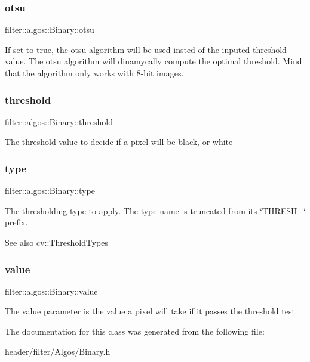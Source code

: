 \subsubsection{\texorpdfstring{otsu}{otsu}}
{\footnotesize\ttfamily filter\+::algos\+::\+Binary\+::otsu}

If set to true, the otsu algorithm will be used insted of the inputed threshold value. The otsu algorithm will dinamycally compute the optimal threshold. Mind that the algorithm only works with 8-\/bit images. \mbox{\label{classfilter_1_1algos_1_1_binary_ae6e7a193b3a4cfd3cfa96d4102333a06}} 
\subsubsection{\texorpdfstring{threshold}{threshold}}
{\footnotesize\ttfamily filter\+::algos\+::\+Binary\+::threshold}

The threshold value to decide if a pixel will be black, or white \mbox{\label{classfilter_1_1algos_1_1_binary_a1f9320375cb787e7f950e5e4721b8022}} 
\subsubsection{\texorpdfstring{type}{type}}
{\footnotesize\ttfamily filter\+::algos\+::\+Binary\+::type}

The thresholding type to apply. The type name is truncated from its \char`\"{}\+T\+H\+R\+E\+S\+H\+\_\+\char`\"{} prefix. \begin{DoxySeeAlso}{See also}
cv\+::\+Threshold\+Types 
\end{DoxySeeAlso}
\mbox{\label{classfilter_1_1algos_1_1_binary_a902a7141b452085bb5c1a50b0d0d6bb0}} 
\subsubsection{\texorpdfstring{value}{value}}
{\footnotesize\ttfamily filter\+::algos\+::\+Binary\+::value}

The value parameter is the value a pixel will take if it passes the threshold test 

The documentation for this class was generated from the following file\+:\begin{DoxyCompactItemize}
\item 
header/filter/\+Algos/Binary.\+h\end{DoxyCompactItemize}
